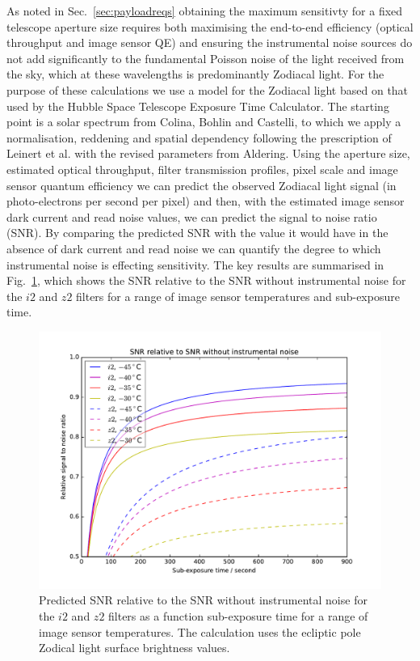 \documentclass[]{iac}
\begin{document}
As noted in Sec.~\ref{sec:payloadreqs} obtaining the maximum sensitivty for a fixed telescope aperture size requires
both maximising the end-to-end efficiency (optical throughput and image sensor QE) and ensuring the instrumental noise
sources do not add significantly to the fundamental Poisson noise of the light received from the sky, which at these
wavelengths is predominantly Zodiacal light. For the purpose of these calculations we use a model for the Zodiacal light
based on that used by the Hubble Space Telescope Exposure Time Calculator\cite{Giavalisco2002}. The starting point is a
solar spectrum from Colina, Bohlin and Castelli\cite{Colina1996}, to which we apply a normalisation, reddening and
spatial dependency following the prescription of Leinert et al.\cite{Leinert1998} with the revised parameters from
Aldering\cite{Aldering2001}. Using the aperture size, estimated optical throughput, filter transmission profiles, pixel
scale and image sensor quantum efficiency we can predict the observed Zodiacal light signal (in photo-electrons per
second per pixel) and then, with the estimated image sensor dark current and read noise values, we can predict the
signal to noise ratio (SNR). By comparing the predicted SNR with the value it would have in the absence of dark current
and read noise we can quantify the degree to which instrumental noise is effecting sensitivity. The key results are
summarised in Fig.~\ref{fig:relsnr}, which shows the SNR relative to the SNR without instrumental noise for the $i2$ and
$z2$ filters for a range of image sensor temperatures and sub-exposure time.

\begin{figure}[htp]
  \center \includegraphics[width=\columnwidth]{figures/relsnr.pdf}
  \caption{\label{fig:relsnr}Predicted SNR relative to the SNR without instrumental noise for the $i2$ and $z2$ filters
    as a function sub-exposure time for a range of image sensor temperatures. The calculation uses the ecliptic pole
    Zodical light surface brightness values.}
\end{figure}
\end{document}
